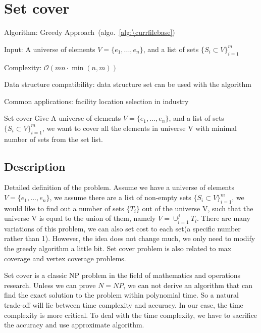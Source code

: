 \documentclass[catalog.tex]{subfiles}
\begin{document}
\def\pbname{Set cover} %

\section{\pbname} 

\begin{overview}
\item [Algorithm:] Greedy Approach~(algo.~\ref{alg:\currfilebase}) 
\item [Input:] A universe of elements $V = \{ e_1, ..., e_n\}$, and a list of sets $\{S_i \subset V\}_{i=1}^m$
\item [Complexity:] $\mathcal{O}(mn\cdot \min(n, m))$
\item [Data structure compatibility:] data structure set can be used with the algorithm
\item [Common applications:] facility location selection in industry
\end{overview}


\begin{problem}{\pbname}
	Give A universe of elements $V = \{ e_1, ..., e_n\}$, and a list of sets $\{S_i \subset V\}_{i=1}^m$, we want to cover all the elements in universe V with minimal number of sets from the set list.
\end{problem}

\subsection*{Description}
Detailed definition of the problem. Assume we have a universe of elements $V = \{ e_1, ..., e_n\}$, we assume there are a list of non-empty sets $\{S_i \subset V\}_{i=1}^m$, we would like to find out a number of sets $\{T_i\}$ out of the universe V, such that the universe V is equal to the union of them, namely $V = \cup_{i=1}^{j}T_i$. There are many variations of this problem, we can also set cost to each set(a specific number rather than 1). However, the idea does not change much, we only need to modify the greedy algorithm a little bit. Set cover problem is also related to max coverage and vertex coverage problems.\newline

Set cover is a classic NP problem in the field of mathematics and operations research. Unless we can prove $N = NP$, we can not derive an algorithm that can find the exact solution to the problem within polynomial time\cite{ve477}. So a natural trade-off will lie between time complexity and accuracy. In our case, the time complexity is more critical. To deal with the time complexity, we have to sacrifice the accuracy and use approximate algorithm.\newline
\end{document}
